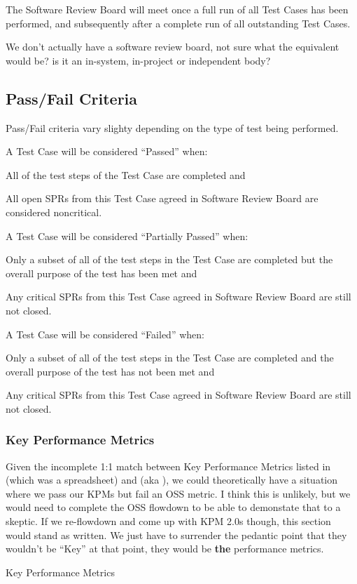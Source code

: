 
The Software Review Board will meet once a full run of all Test Cases has been performed, and subsequently after a complete run of all outstanding Test Cases.

\begin{note}
We don't actually have a software review board, not sure what the equivalent would be? is it an in-system, in-project or independent body?
\end{note}


\subsection{Pass/Fail Criteria}

Pass/Fail criteria vary slighty depending on the type of test being performed.


A Test Case will be considered ``Passed'' when:
\begin{itemize_single}
\item All of the test steps of the Test Case are completed and
\item All open SPRs from this Test Case agreed in Software Review Board are considered noncritical.
\end{itemize_single}

A Test Case will be considered ``Partially Passed'' when:
\begin{itemize_single}
\item Only a subset of all of the test steps in the Test Case are completed but the overall purpose of the test has been met and
\item Any critical SPRs from this Test Case agreed in Software Review Board are still not closed.
\end{itemize_single}

A Test Case will be considered ``Failed'' when:
\begin{itemize_single}
\item Only a subset of all of the test steps in the Test Case are completed and the overall purpose of the test has not been met and
\item Any critical SPRs from this Test Case agreed in Software Review Board are still not closed.
\end{itemize_single}

\subsubsection{Key Performance Metrics}

\begin{note}
Given the incomplete 1:1 match between Key Performance Metrics listed in  (which was a spreadsheet) and  (aka \OSS), we could theoretically have a situation where we pass our KPMs but fail an OSS metric. I think this is unlikely, but we would need to complete the OSS flowdown to be able to demonstate that to a skeptic. If we re-flowdown and come up with KPM 2.0s though, this section would stand as written. We just have to surrender the pedantic point that they wouldn't be ``Key'' at that point, they would be \textbf{the} performance metrics.
\end{note}

Key Performance Metrics
